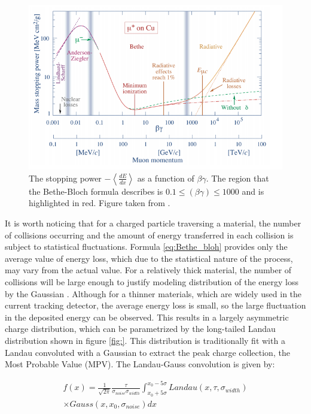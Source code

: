\begin{figure}[h]
\centering
\includegraphics{figures/Bete_bloh.PNG}
\caption{ The stopping power $-\left< \frac{dE}{dx} \right>$ as a function of $\beta \gamma$. The region that the Bethe-Bloch formula describes is $0.1 \le (\beta \gamma) \le 1000$ and is highlighted in red. Figure taken from \cite{PDG}.
\label{fig:event display}}
\end{figure}


It is worth noticing that for a charged particle traversing a material, the number of collisions occurring and the amount of energy transferred in each collision is subject to statistical fluctuations. Formula \ref{eq:Bethe_bloh} provides only the average value of energy loss, which due to the statistical nature of the process, may vary from the actual value. 
For a relatively thick material, the number of collisions will be large enough to justify modeling distribution of the energy loss by the Gaussian \cite{gauss_sensor}. Although for a thinner materials, which are widely used in the current tracking detector, the average energy loss is small, so the large fluctuation in the deposited energy can be observed.    
 This results in a largely asymmetric charge distribution, which can be parametrized by the long-tailed Landau distribution shown in figure \ref{fig:}.  This distribution is traditionally fit with a Landau convoluted with a Gaussian to extract the peak charge collection, the Most Probable Value (MPV). The Landau-Gauss convolution is given by:

\begin{equation}
    \begin{split}
    f(x) = \frac{1}{\sqrt{2 \pi}} \frac{\tau}{\sigma_{noise} \sigma_{width}} \int_{x_0+5\sigma}^{x_0-5\sigma} Landau(x, \tau, \sigma_{width}) \\ \times Gauss (x, x_0,\sigma_{noise}) dx
    \end{split}
\end{equation}

